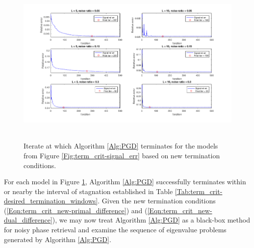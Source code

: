 \begin{figure}[H]
\centering
\hbox{\hspace{-1.9cm} \includegraphics[scale=0.6]{term_crit-model_term_for_tols} }\vspace{-0.4cm}
	\caption{Iterate at which Algorithm \ref{Alg:PGD} terminates for the models from Figure \ref{Fig:term_crit-signal_err} based on new termination conditions.}
\label{Fig:term_crit-model_term_for_tols}
\end{figure}

For each model in Figure \ref{Fig:term_crit-model_term_for_tols}, Algorithm \ref{Alg:PGD} successfully terminates within or nearby the interval of stagnation established in Table \ref{Tab:term_crit-desired_termination_windows}.
Given the new termination conditions (\ref{Eqn:term_crit_new-primal_difference}) and (\ref{Eqn:term_crit_new-dual_difference}), we may now treat Algorithm \ref{Alg:PGD} as a black-box method for noisy phase retrieval and examine the sequence of eigenvalue problems generated by Algorithm \ref{Alg:PGD}.




